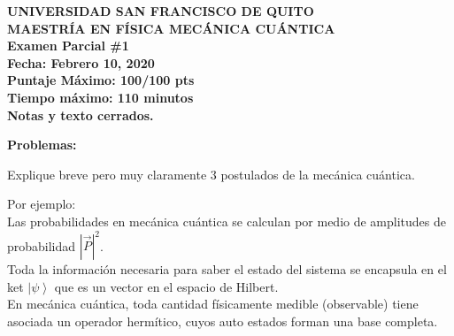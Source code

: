 \documentclass[answers,11pt]{exam}
\newcommand{\abs}[1]{\left| #1 \right|} %
\newcommand{\ket}[1]{\left| #1 \right>} %
\renewcommand{\=}[1]{\stackrel{#1}{=}} %
\theoremstyle{definition}
\theoremstyle{remark}
\begin{document}
\begin{center}
{\bf UNIVERSIDAD SAN FRANCISCO DE QUITO\\
MAESTRÍA EN FÍSICA
MECÁNICA CUÁNTICA \\ 
Examen Parcial \#1 \\ 
Fecha: Febrero 10, 2020 \\
Puntaje Máximo: 100/100 pts\\
Tiempo máximo: 110 minutos \\ 
Notas y texto cerrados.\\
}
\end{center}
\vspace{0.1in}


{\bf Problemas:}\\

\begin{questions}


\question [10] Explique breve pero muy claramente 3 postulados de la
mecánica cuántica.

\begin{solution}
Por ejemplo:\\

Las probabilidades en mecánica cuántica se calculan por medio de amplitudes de probabilidad $\abs {\vec{P}}^{2}$. \\

Toda la información necesaria para saber el estado del sistema se encapsula en el ket $\ket{ \psi}$ que es un vector en el espacio de Hilbert. \\

En mecánica cuántica, toda cantidad físicamente medible (observable) tiene asociada un operador hermítico, cuyos auto estados forman una base completa.\\

\end{solution}



\end{questions}
\end{document}
